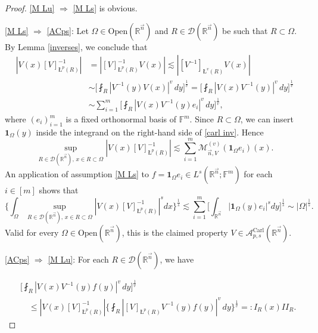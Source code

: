 \documentclass[11pt, reqno]{amsart}
\theoremstyle{definition}
\theoremstyle{remark}
\numberwithin{equation}{section}
\newcommand{\A}{\mathscr A}
\newcommand{\D}{\mathscr D}
\newcommand{\F}{\mathbb F}
\newcommand{\R}{\mathbb R}
\newcommand{\vn}{\vec n}
\newcommand{\one}{\mathbf{1}}
\newcommand{\aveL}{\textit{\L}}
\newcommand{\abs}[1]{|#1|}
\newcommand{\Carl}{\mathrm{Carl}}
\newcommand{\Open}{\mathrm{Open}}
\newcommand{\AC}{\A^{\Carl}}
\begin{document}
\begin{proof}
\eqref{M Lu} $\Rightarrow$ \eqref{M Ls} is obvious.

\eqref{M Ls} $\Rightarrow$ \eqref{ACps}:
Let $\Omega\in\Open(\R^{\vn})$ and $R\in\mathscr D(\R^{\vn})$ be such that $R\subset\Omega$.
By Lemma \ref{inverses}, we conclude that
\begin{equation}\label{carl inv}
\begin{split}
\abs{V(x)[V]_{\aveL^p(R)}^{-1}}
&=\abs{[V]_{\aveL^p(R)}^{-1}V(x)}
\lesssim\abs{[V^{-1}]_{\aveL^v(R)}V(x)}  \\
&\sim\bigg[\fint_R\abs{V^{-1}(y)V(x)}^v \, dy\bigg]^{\frac 1v}
=\bigg[\fint_R\abs{V(x)V^{-1}(y)}^v \, dy\bigg]^{\frac 1v} \\
&\sim\sum_{i=1}^m\bigg[\fint_R\abs{V(x)V^{-1}(y)e_i}^v \, dy\bigg]^{\frac 1v},
\end{split}
\end{equation}
where $(e_i)_{i=1}^m$ is a fixed orthonormal basis of $\F^m$.
Since $R\subset\Omega$, we can insert $\one_\Omega(y)$ inside the integrand on the right-hand side of \eqref{carl inv}.
Hence
\begin{equation*}
\sup_{R\in\D(\R^{\vn}),\, x\in R\subset\Omega}\abs{V(x)[V]_{\aveL^p(R)}^{-1}}
\lesssim\sum_{i=1}^m \mathcal M_{\vn,V}^{(v)}(\one_{\Omega}e_i)(x).
\end{equation*}
An application of assumption \eqref{M Ls} to $f=\one_\Omega e_i\in L^s(\R^{\vn};\F^m)$ for each $i\in[m]$ shows that
\begin{equation*}
\bigg\{\int_{\Omega} \sup_{R\in\D(\R^{\vn}),\, x\in R\subset\Omega}
\abs{V(x)[V]_{\aveL^p(R)}^{-1}}^s dx\bigg\}^{\frac 1s}
\lesssim \sum_{i=1}^m\bigg[\int_{\R^{\vn}}\abs{\one_\Omega(y)e_i}^s dy\bigg]^{\frac 1s}
\sim\abs{\Omega}^{\frac 1s}.
\end{equation*}
Valid for every $\Omega\in\Open(\R^{\vn})$, this is the claimed property $V\in\AC_{p,s}(\R^{\vn})$.

\eqref{ACps} $\Rightarrow$ \eqref{M Lu}:
For each $R\in\D(\R^{\vn})$, we have

\begin{equation}\label{carl to M1}
\begin{split}
&\bigg[\fint_R\abs{V(x)V^{-1}(y)f(y)}^v \, dy\bigg]^{\frac 1v} \\
&\quad\leq\abs{V(x)[V]_{\aveL^p(R)}^{-1}}
\bigg\{\fint_R\abs{[V]_{\aveL^p(R)}V^{-1}(y)f(y)}^v \, dy\bigg\}^{\frac 1v}
=: I_R(x) II_R.
\end{split}
\end{equation}


\end{proof}
\end{document}
